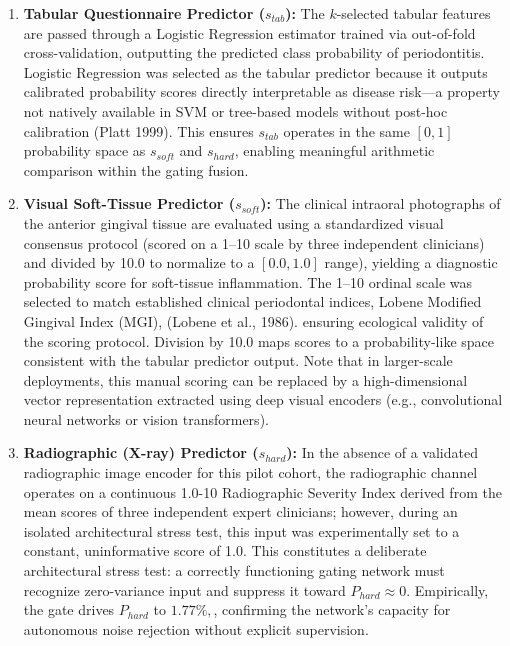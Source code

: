 \documentclass[
]{article}
\begin{document}
\begin{enumerate}
\def\labelenumi{\arabic{enumi}.}
\item
  \textbf{Tabular Questionnaire Predictor (}\(s_{tab}\)\textbf{):} The
  \(k\)-selected tabular features are passed through a Logistic
  Regression estimator trained via out-of-fold cross-validation,
  outputting the predicted class probability of periodontitis. Logistic
  Regression was selected as the tabular predictor because it outputs
  calibrated probability scores directly interpretable as disease
  risk---a property not natively available in SVM or tree-based models
  without post-hoc calibration (Platt 1999). This ensures \(s_{tab}\)
  operates in the same \([ 0,1]\) probability space as \(s_{soft}\) and
  \(s_{hard}\), enabling meaningful arithmetic comparison within the
  gating fusion.
\item
  \textbf{Visual Soft-Tissue Predictor (}\(s_{soft}\)\textbf{):} The
  clinical intraoral photographs of the anterior gingival tissue are
  evaluated using a standardized visual consensus protocol (scored on a
  1--10 scale by three independent clinicians) and divided by 10.0 to
  normalize to a \([ 0.0,1.0]\) range), yielding a diagnostic
  probability score for soft-tissue inflammation. The 1--10 ordinal
  scale was selected to match established clinical periodontal indices,
  Lobene Modified Gingival Index (MGI), (Lobene et al., 1986). ensuring
  ecological validity of the scoring protocol. Division by 10.0 maps
  scores to a probability-like space consistent with the tabular
  predictor output. Note that in larger-scale deployments, this manual
  scoring can be replaced by a high-dimensional vector representation
  extracted using deep visual encoders (e.g., convolutional neural
  networks or vision transformers).
\item
  \textbf{Radiographic (X-ray) Predictor (}\(s_{hard}\)\textbf{):} In
  the absence of a validated radiographic image encoder for this pilot
  cohort, the radiographic channel operates on a continuous 1.0-10
  Radiographic Severity Index derived from the mean scores of three
  independent expert clinicians; however, during an isolated
  architectural stress test, this input was experimentally set to a
  constant, uninformative score of 1.0. This constitutes a deliberate
  architectural stress test: a correctly functioning gating network must
  recognize zero-variance input and suppress it toward
  \(P_{hard} \approx 0\). Empirically, the gate drives \(P_{hard}\) to
  \(1.77\%,\), confirming the network's capacity for autonomous noise
  rejection without explicit supervision.
\end{enumerate}
\end{document}
